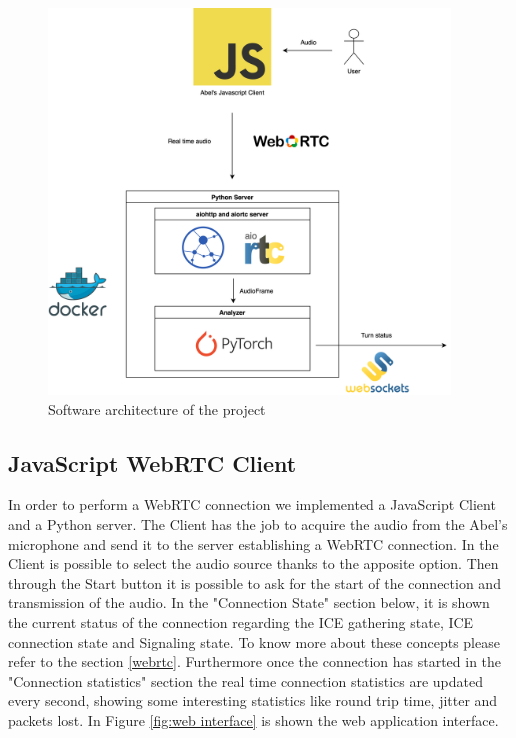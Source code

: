 \documentclass[../main.tex]{subfiles}
\begin{document}
\begin{figure}[ht]
    \centering
    \includegraphics[width=0.95\textwidth]{images/Software architecture.png}
    \caption{Software architecture of the project}
    \label{fig:software architecture}
\end{figure}

\subsection{JavaScript WebRTC Client}

In order to perform a WebRTC connection we implemented a JavaScript Client and a Python server. The Client has the job to acquire the audio from the Abel's microphone and send it to the server establishing a WebRTC connection. In the Client is possible to select the audio source thanks to the apposite option. Then through the Start button it is possible to ask for the start of the connection and transmission of the audio. In the "Connection State" section below, it is shown the current status of the connection regarding the ICE gathering state, ICE connection state and Signaling state. To know more about these concepts please refer to the section \ref{webrtc}. Furthermore once the connection has started in the "Connection statistics" section the real time connection statistics are updated every second, showing some interesting statistics like round trip time, jitter and packets lost.
In Figure \ref{fig:web interface} is shown the web application interface.
\end{document}

